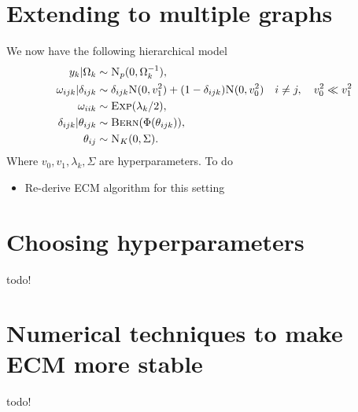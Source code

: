 \documentclass{scrartcl}
\newcommand{\1}{\mathds{1}}
\newcommand{\Np}{\textsc{N}_p}
\newcommand{\Nor}{\textsc{N}}
\newcommand{\Bern}{\textsc{Bern}}
\newcommand{\Exp}{\textsc{Exp}}
\begin{document}
\section{Extending to multiple graphs}
We now have the following hierarchical model
\begin{align*}
	y_k | \Omega_k              & \sim \Np(0, \Omega_k^{-1}),                                                                                \\
	\omega_{ijk} | \delta_{ijk} & \sim \delta_{ijk} \Nor(0, v_1^2) + (1 - \delta_{ijk}) \Nor(0, v_0^2) \quad i \neq j, \quad v_0^2 \ll v_1^2 \\
	\omega_{iik}                & \sim \Exp(\lambda_k/2),                                                                                    \\
	\delta_{ijk} | \theta_{ijk} & \sim \Bern(\Phi(\theta_{ijk})),                                                                            \\
	\theta_{ij}                 & \sim \textsc{N}_K(0, \Sigma).
\end{align*}
Where $v_0, v_1, \lambda_k, \Sigma$ are hyperparameters.
To do
\begin{itemize}
	\item Re-derive ECM algorithm for this setting
\end{itemize}

\section{Choosing hyperparameters}
todo!

\section{Numerical techniques to make ECM more stable}
todo!
\end{document}
